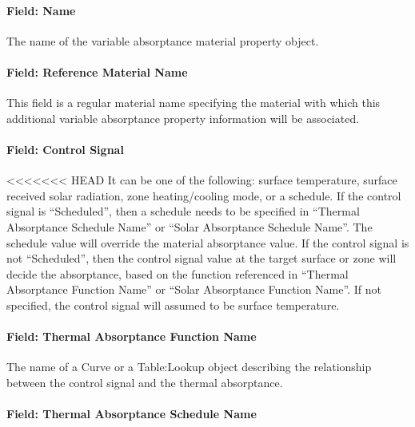 \paragraph{Field: Name}\label{field-name-materialpropertyvariableabsorptance}

The name of the variable absorptance material property object.

\paragraph{Field: Reference Material Name}\label{field-reference-material-name-materialpropertyvariableabsorptance}

This field is a regular material name specifying the material with which this additional
variable absorptance property information will be associated.

\paragraph{Field: Control Signal}\label{field-control-signal}

<<<<<<< HEAD
It can be one of the following: surface temperature, surface received solar radiation, zone heating/cooling mode, or a schedule.
If the control signal is ``Scheduled'', then a schedule needs to be specified in ``Thermal Absorptance Schedule Name'' or
``Solar Absorptance Schedule Name''. The schedule value will override the material absorptance value. If the control signal
is not ``Scheduled'', then the control signal value at the target surface or zone will decide the absorptance, based on
the function referenced in ``Thermal Absorptance Function Name'' or ``Solar Absorptance Function Name''. If not specified,
the control signal will assumed to be surface temperature.

\paragraph{Field: Thermal Absorptance Function Name}\label{field-thermal-absorptance-function-name}

The name of a Curve or a Table:Lookup object describing the relationship between the control signal and the thermal absorptance.

\paragraph{Field: Thermal Absorptance Schedule Name}\label{field-thermal-absorptance-schedule-name}

